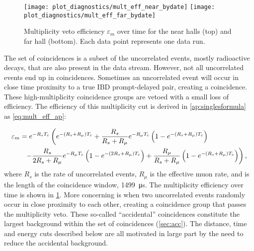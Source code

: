 \begin{figure}
    \texttt{[image: plot\_diagnostics/mult\_eff\_near\_bydate]}
    \texttt{[image: plot\_diagnostics/mult\_eff\_far\_bydate]}
    \caption{
        Multiplicity veto efficiency $\varepsilon_m$ over time for
        the near halls (top) and far hall (bottom).
        Each data point represents one data run.
    }
    \label{fig:mult_eff}
\end{figure}
The set of  coincidences is a subset
of the uncorrelated events, mostly radioactive decays,
that are also present in the data stream.
However, not all uncorrelated events end up in  coincidences.
Sometimes an uncorrelated event will occur in close time proximity to
a true IBD prompt-delayed pair, creating a  coincidence.
These high-multiplicity coincidence groups are vetoed
with a small loss of efficiency.
The efficiency of this multiplicity cut is derived in \cref{ap:singlesformula} as
\cref{eq:mult_eff_ap}:

\begin{align}
    \label{eq:mult_eff}
    \begin{split}
        \varepsilon_m &= e^{-R_s T_c}
        \left(
            e^{-(R_s + R_\mu)T_c} +
            \frac{R_s}{R_s+R_\mu} e^{-R_\mu T_c}
            \left(
                1 - e^{-(R_s + R_\mu)T_c}
            \right)
        \right. \\
              &\ \ \left. - \frac{R_s}{2R_s + R_\mu} e^{-R_\mu T_c}
                  \left(
                      1 - e^{-(2R_s + R_\mu)T_c}
                  \right) +
                  \frac{R_\mu}{R_s + R_\mu}
                  \left(
                      1 - e^{-(R_s + R_\mu)T_c}
                  \right)
              \right),
    \end{split}
\end{align}
where $R_s$ is the rate of uncorrelated events,
$R_\mu$ is the effective muon rate,
and \tc{} is the length of the coincidence window, \SI{1499}{\us}.
The multiplicity efficiency over time is shown in \cref{fig:mult_eff}.
More concerning is when two uncorrelated events
randomly occur in close proximity to each other,
creating a  coincidence group that passes the multiplicity veto.
These so-called ``accidental'' coincidences
constitute the largest background within the set of  coincidences
(\cref{sec:acc}).
The distance, time and energy cuts described below
are all motivated in large part by the need to reduce the accidental background.


